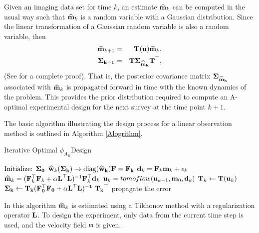 \documentclass[12pt]{article}
\newcommand {\bfd}   { {\bf d} }
\newcommand {\bfu}   { {\bf u} }
\newcommand {\bfm}   { {\bf m} }
\newcommand {\bfF}  { {\bf F} }
\newcommand{\bT}  {\text{\bf T}} %
\newcommand{\bfL}  {\text{{\bf L}}} %
\newcommand{\mhat}{\widehat{\bf m}}
\newcommand{\what}{\widehat{\bf w}}
\newcommand{\Sigh}{\bf \Sigma}
\begin{document}
Given an imaging data set for time $k$, an estimate $\mhat_k$ can be computed in the usual way such that $\mhat_k$ is a random  variable with  a Gaussian distribution. 
Since the linear transformation of a Gaussian random variable is also a random variable, then  
\begin{eqnarray*}
\mhat _{k+1} &=& \bT(\bfu)\mhat_k,\\
 \Sigh_{k+1} &=& \bT \Sigh_{\mhat_k} {\bT}^{\top},
\end{eqnarray*}  
 (See \cite{Maybeck1979} for a complete proof).
That is, the posterior covariance matrix $\Sigh_{\mhat_k}$ associated with  $\mhat_k$ is propagated forward in time with the known dynamics of the problem. This provides the prior distribution required to compute an A-optimal experimental design for the next survey at the time point $k+1$.

The basic algorithm illustrating the design process for a linear observation method is outlined in Algorithm \ref{Alogrithm}. 
\begin{algorithm}
\caption{Iterative Optimal $\phi_{A_{B}}$Design}\label{Alogrithm}
\begin{algorithmic}[1]
%
\State $\text{Initialize: }\Sigh_0$
%
%
\State $\what_k(\Sigh_k) \to \text{diag}(\what_k)\bfF = \bfF_k $ 
%
\State $\bfd_k = \bfF_k \bfm_k + \epsilon_k$
%
\State $\mhat_k = (\bfF_k^{\top}\bfF_k +\alpha \bfL^{\top} \bfL)^{-1}\bfF_k^{\top} \bfd_k  $
%
%
\State $\bfu_k = tomoflow(\bfu_{k-1}, \bfm_0, \bfd_k) $
%
%
\State $\bT_{k} \gets \bT(\bfu_k)$
%
\State $\Sigh_{k} \gets {\bT_{k}}(\bfF_0^{\top} \bfF_0 +\alpha \bfL^{\top} \bfL)^{-1}\;{\bT_{k}}^{\top}$ 
\Comment propagate the error
%
\EndFor\label{euclidendwhile}
\end{algorithmic}
\end{algorithm}
In this algorithm  $\mhat_k$ is estimated using a Tikhonov method with a regularization operator $\bfL$. To design the experiment, only data from the current time step is used, and the velocity field $\bfu$ is given.
\end{document}
